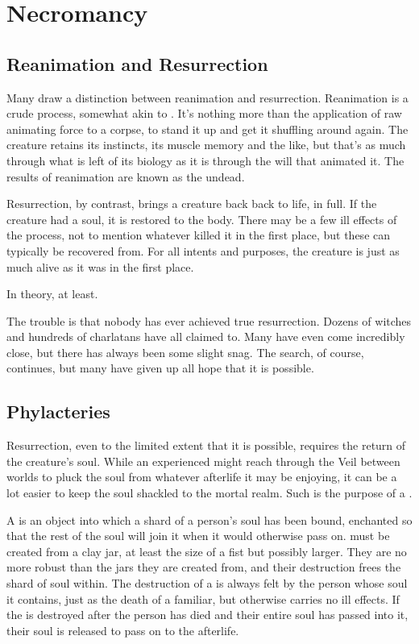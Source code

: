 \chapter{Necromancy}

\section{Reanimation and Resurrection}

Many  draw a distinction between reanimation and resurrection.
Reanimation is a crude process, somewhat akin to .
It's nothing more than the application of raw animating force to a corpse, to stand it up and get it shuffling around again.
The creature retains its instincts, its muscle memory and the like, but that's as much through what is left of its biology as it is through the will that animated it.
The results of reanimation are known as the undead.

Resurrection, by contrast, brings a creature back back to life, in full.
If the creature had a soul, it is restored to the body.
There may be a few ill effects of the process, not to mention whatever killed it in the first place, but these can typically be recovered from.
For all intents and purposes, the creature is just as much alive as it was in the first place.

In theory, at least.

The trouble is that nobody has ever achieved true resurrection.
Dozens of witches and hundreds of charlatans have all claimed to.
Many have even come incredibly close, but there has always been some slight snag.
The search, of course, continues, but many have given up all hope that it is possible.

\section{Phylacteries}

Resurrection, even to the limited extent that it is possible, requires the return of the creature's soul.
While an experienced  might reach through the Veil between worlds to pluck the soul from whatever afterlife it may be enjoying, it can be a lot easier to keep the soul shackled to the mortal realm.
Such is the purpose of a {\phylactery}.

A {\phylactery} is an object into which a shard of a person's soul has been bound, enchanted so that the rest of the soul will join it when it would otherwise pass on.
{\phylacteries} must be created from a clay jar, at least the size of a fist but possibly larger.
They are no more robust than the jars they are created from, and their destruction frees the shard of soul within.
The destruction of a {\phylactery} is always felt by the person whose soul it contains, just as the death of a familiar, but otherwise carries no ill effects.
If the {\phylactery} is destroyed after the person has died and their entire soul has passed into it, their soul is released to pass on to the afterlife.

